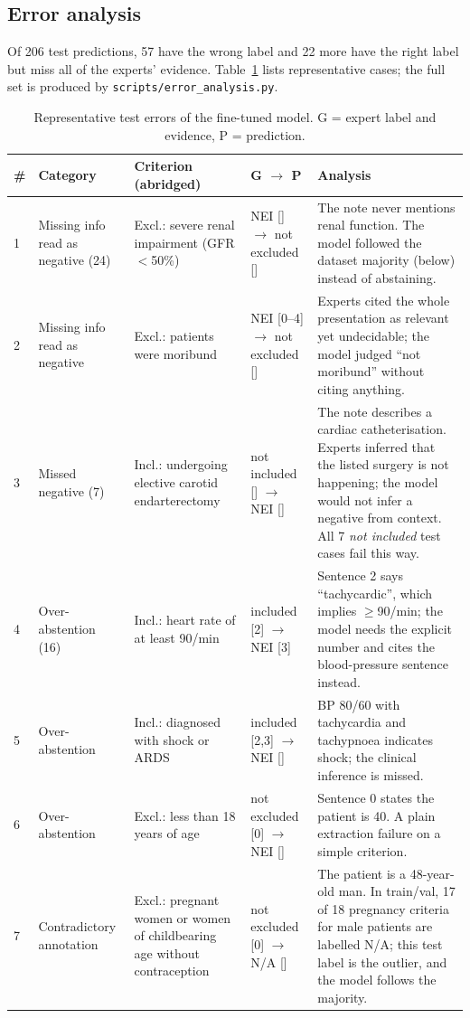 \documentclass[conference]{IEEEtran}
\begin{document}
\subsection{Error analysis}\label{sec:errors}
Of 206 test predictions, 57 have the wrong label and 22 more have the right label but miss all of the experts' evidence. Table~\ref{tab:errors} lists representative cases; the full set is produced by \texttt{scripts/error\_analysis.py}.

\begin{table}[t]
\centering
\caption{Representative test errors of the fine-tuned model. G = expert label and evidence, P = prediction.}
\label{tab:errors}
\small
\begin{tabular}{p{0.3cm}p{2.6cm}p{4.5cm}p{3.1cm}p{5.4cm}}
\toprule
\# & Category & Criterion (abridged) & G $\to$ P & Analysis \\
\midrule
1 & Missing info read as negative (24) & Excl.: severe renal impairment (GFR $<$50\%) & NEI [] $\to$ not excluded [] & The note never mentions renal function. The model followed the dataset majority (below) instead of abstaining. \\
2 & Missing info read as negative & Excl.: patients were moribund & NEI [0--4] $\to$ not excluded [] & Experts cited the whole presentation as relevant yet undecidable; the model judged ``not moribund'' without citing anything. \\
3 & Missed negative (7) & Incl.: undergoing elective carotid endarterectomy & not included [] $\to$ NEI [] & The note describes a cardiac catheterisation. Experts inferred that the listed surgery is not happening; the model would not infer a negative from context. All 7 \emph{not included} test cases fail this way. \\
4 & Over-abstention (16) & Incl.: heart rate of at least 90/min & included [2] $\to$ NEI [3] & Sentence 2 says ``tachycardic'', which implies $\geq$90/min; the model needs the explicit number and cites the blood-pressure sentence instead. \\
5 & Over-abstention & Incl.: diagnosed with shock or ARDS & included [2,3] $\to$ NEI [] & BP 80/60 with tachycardia and tachypnoea indicates shock; the clinical inference is missed. \\
6 & Over-abstention & Excl.: less than 18 years of age & not excluded [0] $\to$ NEI [] & Sentence 0 states the patient is 40. A plain extraction failure on a simple criterion. \\
7 & Contradictory annotation & Excl.: pregnant women or women of childbearing age without contraception & not excluded [0] $\to$ N/A [] & The patient is a 48-year-old man. In train/val, 17 of 18 pregnancy criteria for male patients are labelled N/A; this test label is the outlier, and the model follows the majority. \\

\end{tabular}
\end{table}
\end{document}

